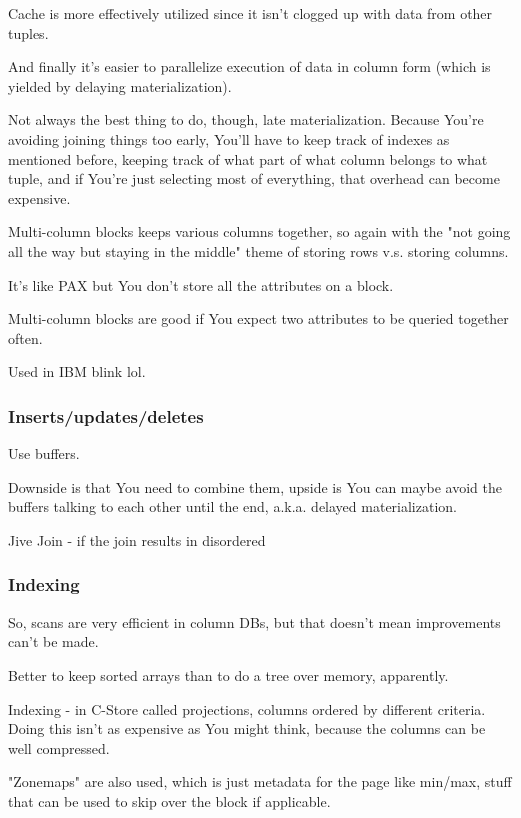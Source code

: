 \documentclass{article}
\begin{document}
			Cache is more effectively utilized since it isn't clogged up with data from other tuples.
			
			And finally it's easier to parallelize execution of data in column form (which is yielded by delaying materialization).
			
			Not always the best thing to do, though, late materialization. Because You're avoiding joining things too early, You'll have to keep track of indexes as mentioned before, keeping track of what part of what column belongs to what tuple, and if You're just selecting most of everything, that overhead can become expensive.
			
			Multi-column blocks keeps various columns together, so again with the "not going all the way but staying in the middle" theme of storing rows v.s. storing columns.
			
			It's like PAX but You don't store all the attributes on a block.
			
			Multi-column blocks are good if You expect two attributes to be queried together often.
			
			Used in IBM blink lol.
			
		\subsubsection{Inserts/updates/deletes}
		
			Use buffers.
			
			Downside is that You need to combine them, upside is You can maybe avoid the buffers talking to each other until the end, a.k.a. delayed materialization.
			
			Jive Join - if the join results in disordered 
			
		\subsubsection{Indexing}
			
			So, scans are very efficient in column DBs, but that doesn't mean improvements can't be made.
			
			Better to keep sorted arrays than to do a tree over memory, apparently.
			
			Indexing - in C-Store called projections, columns ordered by different criteria. Doing this isn't as expensive as You might think, because the columns can be well compressed.
		
			"Zonemaps" are also used, which is just metadata for the page like min/max, stuff that can be used to skip over the block if applicable.
			
\end{document}
